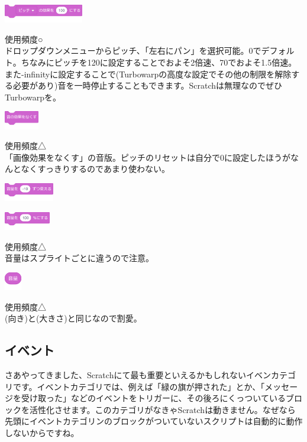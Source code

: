 \documentclass[b5paper,10pt]{jsarticle}
\begin{document}
\begin{multicols*}{3}
\begin{itembox}{4}
\includegraphics[height=8mm]{images/sound_5.png}
\end{itembox}
使用頻度○\\
ドロップダウンメニューからピッチ、「左右にパン」を選択可能。0でデフォルト。ちなみにピッチを120に設定することでおよそ2倍速、70でおよそ1.5倍速。また-infinityに設定することで(Turbowarpの高度な設定でその他の制限を解除する必要があり)音を一時停止することもできます。Scratchは無理なのでぜひTurbowarpを。
\begin{itembox}{5}
\includegraphics[height=8mm]{images/sound_6.png}
\end{itembox}
使用頻度△\\
「画像効果をなくす」の音版。ピッチのリセットは自分で0に設定したほうがなんとなくすっきりするのであまり使わない。
\begin{itembox}{6}
\includegraphics[height=8mm]{images/sound_7.png}

\includegraphics[height=8mm]{images/sound_8.png}
\end{itembox}
使用頻度△\\
音量はスプライトごとに違うので注意。
\begin{itembox}{7}
\includegraphics[height=8mm]{images/sound_9.png}
\end{itembox}
使用頻度△\\
(向き)と(大きさ)と同じなので割愛。

\subsection{イベント}
さあやってきました、Scratchにて最も重要といえるかもしれないイベンカテゴリです。イベントカテゴリでは、例えば「緑の旗が押された」とか、「メッセージを受け取った」などのイベントをトリガーに、その後ろにくっついているブロックを活性化させます。このカテゴリがなきゃScratchは動きません。なぜなら先頭にイベントカテゴリンのブロックがついていないスクリプトは自動的に動作しないからですね。


\end{multicols*}
\end{document}

